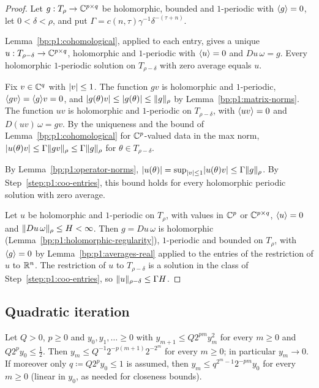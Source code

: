 \begin{proof}
Let $g:T_\rho\to\mathbb{C}^{p\times q}$ be holomorphic, bounded and $1$-periodic with $\langle g\rangle=0$, let
$0<\delta<\rho$, and put $\Gamma=c(n,\tau)\gamma^{-1}\delta^{-(\tau+n)}$.

\label{step:p1:coo-entries}
Lemma~\ref{bp:p1:cohomological}, applied to each entry, gives a unique $u:T_{\rho-\delta}\to\mathbb{C}^{p\times q}$,
holomorphic and $1$-periodic with $\langle u\rangle=0$ and $Du\,\omega=g$. Every holomorphic $1$-periodic solution
on $T_{\rho-\delta}$ with zero average equals $u$.

\label{step:p1:coo-vectors}
Fix $v\in\mathbb{C}^q$ with $\lvert v\rvert\le1$. The function $gv$ is holomorphic and $1$-periodic, $\langle gv\rangle=\langle g\rangle v=0$,
and $\lvert g(\theta)v\rvert\le\lvert g(\theta)\rvert\le\lVert g\rVert_\rho$ by Lemma~\ref{bp:p1:matrix-norms}. The function
$uv$ is holomorphic and $1$-periodic on $T_{\rho-\delta}$, with $\langle uv\rangle=0$ and $D(uv)\,\omega=gv$. By the
uniqueness and the bound of Lemma~\ref{bp:p1:cohomological} for $\mathbb{C}^p$-valued data in the max norm,
$\lvert u(\theta)v\rvert\le\Gamma\lVert gv\rVert_\rho\le\Gamma\lVert g\rVert_\rho$ for $\theta\in T_{\rho-\delta}$.

\label{step:p1:coo-norm}
By Lemma~\ref{bp:p1:operator-norms}, $\lvert u(\theta)\rvert=\sup_{\lvert v\rvert\le1}\lvert u(\theta)v\rvert\le\Gamma\lVert g\rVert_\rho$.
By Step~\ref{step:p1:coo-entries}, this bound holds for every holomorphic periodic solution with zero
average.

\label{step:p1:coo-apriori}
Let $u$ be holomorphic and $1$-periodic on $T_\rho$, with values in $\mathbb{C}^p$ or $\mathbb{C}^{p\times q}$,
$\langle u\rangle=0$ and $\lVert Du\,\omega\rVert_\rho\le H<\infty$. Then $g=Du\,\omega$ is holomorphic
(Lemma~\ref{bp:p1:holomorphic-regularity}), $1$-periodic and bounded on $T_\rho$, with $\langle g\rangle=0$ by
Lemma~\ref{bp:p1:averages-real} applied to the entries of the restriction of $u$ to $\mathbb{R}^n$. The restriction
of $u$ to $T_{\rho-\delta}$ is a solution in the class of Step~\ref{step:p1:coo-entries}, so
$\lVert u\rVert_{\rho-\delta}\le\Gamma H$.
\end{proof}

\subsection{Quadratic iteration}\label{bp:p1:sec-iteration}

\begin{lemma}\label{bp:p1:iteration}
Let $Q>0$, $p\ge0$ and $y_0,y_1,\dots\ge0$ with $y_{m+1}\le Q2^{pm}y_m^2$ for every $m\ge0$ and
$Q2^py_0\le\frac12$. Then $y_m\le Q^{-1}2^{-p(m+1)}2^{-2^m}$ for every $m\ge0$; in particular $y_m\to0$.
If moreover only $q\coloneqq Q2^py_0\le1$ is assumed, then $y_m\le q^{2^m-1}2^{-pm}y_0$ for every $m\ge0$
(linear in $y_0$, as needed for closeness bounds).
\end{lemma}

